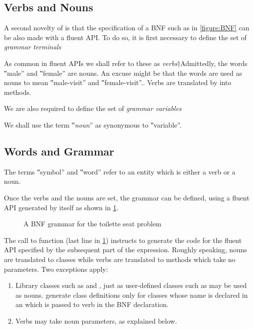 \subsection{Verbs and Nouns}
A second novelty of \Fajita is that the specification of a BNF such as in
\cref{figure:BNF} can be also made with a \Java fluent API\@.
To do so, it is first necessary to
define the set of \emph{grammar terminals}
\begin{quote}
\end{quote}
As common in fluent APIs we shall refer to these
as \emph{verbs}†{Admittedly, the words ‟male” and ‟female” are nouns.
An excuse might be that the words are used as nouns to mean ‟male-visit” and ‟female-visit”.}.
Verbs are translated by \Fajita into methods.

We are also required to define the set of \emph{grammar variables}
\begin{quote}
\end{quote}

We shall use the term ‟\emph{noun}” as synonymous to ‟variable”.

\subsection{Words and Grammar}
The terms ‟symbol” and ‟word” refer to an entity which is either
a verb or a noun.

Once the verbs and the nouns are set, the grammar can be defined,
using a fluent API generated by \Fajita itself as shown
in \cref{figure:fluent}.

\begin{figure}
  \caption{A BNF grammar for the toilette seat problem}
  \label{figure:fluent}
\end{figure}

The call to function  (last line in \cref{figure:fluent}) instructs
\Fajita to generate the code for the fluent API specified by the
subsequent part of the expression.
Roughly speaking, nouns are translated to classes while verbs are translated to methods which
take no parameters.
Two exceptions apply:
\begin{enumerate}
  \item
        Library classes such as  and , just as user-defined
        classes such as  may be used as nouns.
        \Fajita generate class definitions only for classes whose name is declared
        in an  which is passed to  verb in the BNF declaration.
  \item Verbs may take noun parameters, as explained below.
\end{enumerate}

